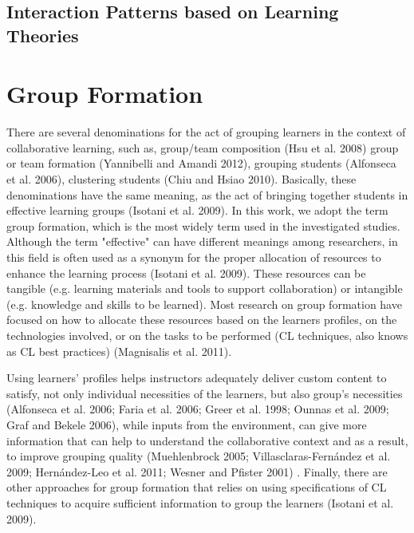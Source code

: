 \subsection{Interaction Patterns based on Learning Theories}

\section{Group Formation}
There are several denominations for the act of grouping learners in the context of collaborative learning, such as, group/team composition (Hsu et al. 2008) group or team formation (Yannibelli and Amandi 2012), grouping students (Alfonseca et al. 2006), clustering students (Chiu and Hsiao 2010). Basically, these denominations have the same meaning, as the act of bringing together students in effective learning groups (Isotani et al. 2009). In this work, we adopt the term group formation, which is the most widely term used in the investigated studies.
Although the term "effective" can have different meanings among researchers, in this field is often used as a synonym for the proper allocation of resources to enhance the learning process (Isotani et al. 2009). These resources can be tangible (e.g. learning materials and tools to support collaboration) or intangible (e.g. knowledge and skills to be learned). Most research on group formation have focused on how to allocate these resources based on the learners profiles, on the technologies involved, or on the tasks to be performed (CL techniques, also knows as CL best practices) (Magnisalis et al. 2011).

Using learners' profiles helps instructors adequately deliver custom content to satisfy, not only individual necessities of the learners, but also group's necessities (Alfonseca et al. 2006; Faria et al. 2006; Greer et al. 1998; Ounnas et al. 2009; Graf and Bekele 2006), while inputs from the environment, can give more information that can help to understand the collaborative context and as a result, to improve grouping quality (Muehlenbrock 2005; Villasclaras-Fernández et al. 2009; Hernández-Leo et al. 2011; Wesner and Pfister 2001) . Finally, there are other approaches for group formation that relies on using specifications of CL techniques to acquire sufficient information to group the learners (Isotani et al. 2009).

